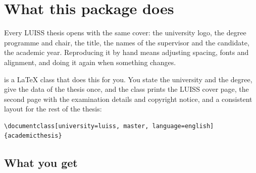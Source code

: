 \documentclass[11pt,a4paper,oneside]{report}
\begin{document}

{\setlength{\parskip}{0pt}\tableofcontents}


\chapter{What this package does}

Every LUISS thesis opens with the same cover: the university logo, the
degree programme and chair, the title, the names of the supervisor and the
candidate, the academic year. Reproducing it by hand means adjusting
spacing, fonts and alignment, and doing it again when something changes.

 is a \LaTeX{} class that does this for you. You state
the university and the degree, give the data of the thesis once, and the
class prints the LUISS cover page, the second page with the examination
details and copyright notice, and a consistent layout for the rest of the
thesis:

\begin{lstlisting}
\documentclass[university=luiss, master, language=english]{academicthesis}
\end{lstlisting}

\section{What you get}

\begin{center}
  \hfill
  \hfill
\end{center}
\end{document}
